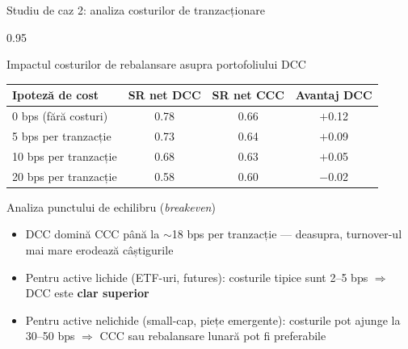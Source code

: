 \documentclass[9pt, aspectratio=169, t]{beamer}
\begin{document}
\begin{frame}{Studiu de caz 2: analiza costurilor de tranzacționare}
    \begin{cminipage}{0.95\textwidth}
    {\footnotesize
    \begin{block}{Impactul costurilor de rebalansare asupra portofoliului DCC}
        \vspace{0.1cm}
        {\small
        \begin{center}
        \begin{tabular}{l|ccc}
            \hline
            \textbf{Ipoteză de cost} & \textbf{SR net DCC} & \textbf{SR net CCC} & \textbf{Avantaj DCC} \\
            \hline
            0 bps (fără costuri)  & 0.78 & 0.66 & $+$0.12 \\
            5 bps per tranzacție  & 0.73 & 0.64 & $+$0.09 \\
            10 bps per tranzacție & 0.68 & 0.63 & $+$0.05 \\
            20 bps per tranzacție & 0.58 & 0.60 & $-$0.02 \\
            \hline
        \end{tabular}
        \end{center}
        }
    \end{block}
    \begin{alertblock}{Analiza punctului de echilibru (\textit{breakeven})}
        \begin{itemize}\setlength{\itemsep}{0pt}
            \item DCC domină CCC până la $\sim$18 bps per tranzacție --- deasupra, turnover-ul mai mare erodează câștigurile
            \item Pentru active lichide (ETF-uri, futures): costurile tipice sunt 2--5 bps $\Rightarrow$ DCC este \textbf{clar superior}
            \item Pentru active nelichide (small-cap, piețe emergente): costurile pot ajunge la 30--50 bps $\Rightarrow$ CCC sau rebalansare lunară pot fi preferabile
        \end{itemize}
    \end{alertblock}
    }
    \end{cminipage}
\end{frame}
\end{document}
